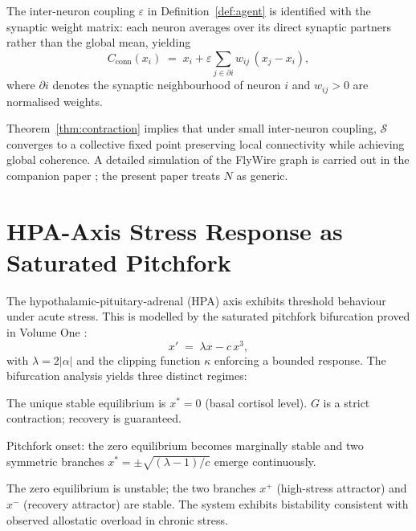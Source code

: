 \documentclass[12pt,a4paper]{article}
\begin{document}
The inter-neuron coupling $\varepsilon$ in Definition~\ref{def:agent} is
identified with the synaptic weight matrix: each neuron averages over its
direct synaptic partners rather than the global mean, yielding
\begin{equation}
  C_{\text{conn}}(x_i) \;=\; x_i + \varepsilon \sum_{j \in \partial i}
    w_{ij}\,(x_j - x_i),
  \label{eq:Cconn}
\end{equation}
where $\partial i$ denotes the synaptic neighbourhood of neuron $i$ and
$w_{ij} > 0$ are normalised weights.

Theorem~\ref{thm:contraction} implies that under small inter-neuron coupling,
$\mathcal{S}$ converges to a collective fixed point preserving local connectivity
while achieving global coherence.  A detailed simulation of the FlyWire graph
is carried out in the companion paper
\cite{companion}; the present paper treats $N$ as generic.

\section{HPA-Axis Stress Response as Saturated Pitchfork}
\label{sec:hpa}

The hypothalamic-pituitary-adrenal (HPA) axis exhibits threshold behaviour under
acute stress.  This is modelled by the saturated pitchfork bifurcation proved in
Volume One \cite{vol1}:
\begin{equation}
  x' \;=\; \lambda x - c\,x^3,
  \label{eq:pitchfork}
\end{equation}
with $\lambda = 2|\alpha|$ and the clipping function $\kappa$ enforcing a
bounded response.  The bifurcation analysis yields three distinct regimes:

\begin{description}[nosep]
  \item[Sub-threshold ($|\alpha| < \tfrac{1}{2}$).]
    The unique stable equilibrium is $x^* = 0$ (basal cortisol level).
    $G$ is a strict contraction; recovery is guaranteed.
  \item[Critical coupling ($|\alpha| = \tfrac{1}{2}$).]
    Pitchfork onset: the zero equilibrium becomes marginally stable and two
    symmetric branches $x^* = \pm \sqrt{(\lambda-1)/c}$ emerge continuously.
  \item[Super-threshold ($|\alpha| > \tfrac{1}{2}$).]
    The zero equilibrium is unstable; the two branches $x^+$ (high-stress
    attractor) and $x^-$ (recovery attractor) are stable.  The system exhibits
    bistability consistent with observed allostatic overload in chronic stress.
\end{description}
\end{document}
